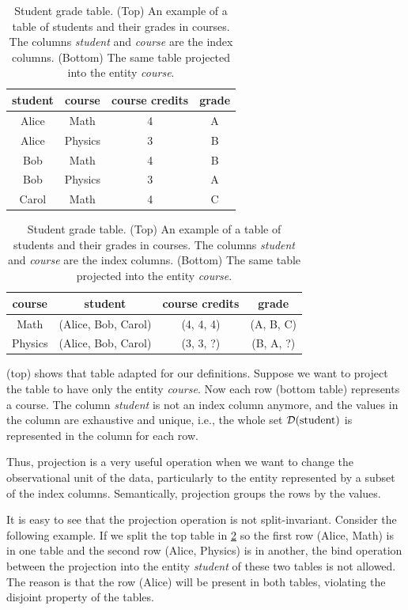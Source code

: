 \begin{table}
  \centering
  \begin{tabular}{cccc}
    \toprule
    \textbf{student} & \textbf{course} & \textbf{course credits} & \textbf{grade} \\
    \midrule
    Alice & Math & 4 & A \\
    Alice & Physics & 3 & B \\
    Bob & Math & 4 & B \\
    Bob & Physics & 3 & A \\
    Carol & Math & 4 & C \\
    \bottomrule
  \end{tabular}

  \vspace{1em}
  \begin{tabular}{cccc}
    \toprule
    \textbf{course} & \textbf{student} & \textbf{course credits} & \textbf{grade} \\
    \midrule
    Math & (Alice, Bob, Carol) & (4, 4, 4) & (A, B, C) \\
    Physics & (Alice, Bob, Carol) & (3, 3, ?) & (B, A, ?) \\
    \bottomrule
  \end{tabular}
  \caption{
  Student grade table.
  (Top) An example of a table of students and their grades in courses.  The columns
  \emph{student} and \emph{course} are the index columns. (Bottom) The same table
  projected into the entity \emph{course}.
  }
  \label{tab:student-grade-handling}
\end{table}

 (top) shows that table adapted for our definitions.
Suppose we want to project the table to have only the entity \emph{course}.
Now each row (bottom table) represents a course.  The column \emph{student} is not an
index column anymore, and the values in the column are exhaustive and unique, i.e.,
the whole set $\mathcal{D}\!\left(\text{student}\right)$ is represented in the column for each row.

Thus, projection is a very useful operation when we want to change the observational unit
of the data, particularly to the entity represented by a subset of the index columns.
Semantically, projection groups the rows by the values.

It is easy to see that the projection operation is not split-invariant.  Consider the
following example. If we split the top table in \cref{tab:student-grade-handling} so the
first row (Alice, Math) is in one table and the second row (Alice, Physics) is in another,
the bind operation between the projection into the entity \emph{student} of these two
tables is not allowed.  The reason is that the row (Alice) will be present in both tables,
violating the disjoint property of the tables.

